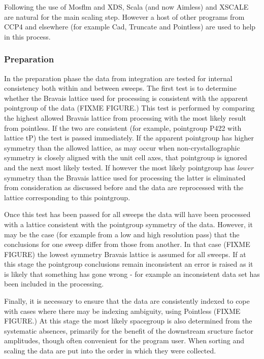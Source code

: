 \documentclass[a4paper,11pt]{article}
\begin{document}
Following the use of Mosflm and XDS, Scala (and now Aimless) and
XSCALE are natural for the main scaling step. However a host of other
programs from CCP4 and elsewhere (for example Cad, Truncate and
Pointless) are used to help in this process.

\subsubsection{Preparation}

In the preparation phase the data from integration are tested for
internal consistency both within and between sweeps. The first test is
to determine whether the Bravais lattice used for processing is
consistent with the apparent pointgroup of the data (FIXME FIGURE.)
This test is performed by comparing the highest allowed Bravais
lattice from processing with the most likely result from pointless. If
the two are consistent (for example, pointgroup P422 with lattice tP)
the test is passed immediately. If the apparent pointgroup has higher
symmetry than the allowed lattice, as may occur when
non-crystallographic symmetry is closely aligned with the unit cell
axes, that pointgroup is ignored and the next most likely tested. If
however the most likely pointgroup has \emph{lower} symmetry than the
Bravais lattice used for processing the latter is eliminated from
consideration as discussed before and the data are reprocessed with
the lattice corresponding to this pointgroup.

Once this test has been passed for all sweeps the data will have been
processed with a lattice consistent with the pointgroup symmetry of
the data. However, it may be the case (for example from a low and high
resolution pass) that the conclusions for one sweep differ from those
from another. In that case (FIXME FIGURE) the lowest symmetry Bravais
lattice is assumed for all sweeps. If at this stage the pointgroup
conclusions remain inconsistent an error is raised as it is likely
that something has gone wrong - for example an inconsistent data set
has been included in the processing. 

Finally, it is necessary to ensure that the data are consistently
indexed to cope with cases where there may be indexing ambiguity,
using Pointless (FIXME FIGURE.) At this stage the most likely
spacegroup is also determined from the systematic absences, primarily
for the benefit of the downstream sructure factor amplitudes, though
often convenient for the program user. When sorting and scaling the
data are put into the order in which they were collected.
\end{document}
